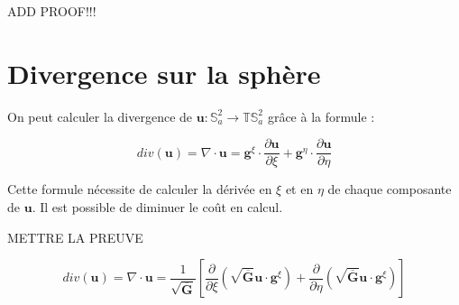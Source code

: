 ADD PROOF!!!


\section{Divergence sur la sphère}

On peut calculer la divergence de $\mathbf{u} : \mathbb{S}^2_a \rightarrow \mathbb{T} \mathbb{S}^2_a$ grâce à la formule :

\begin{equation}
div( \mathbf{u} ) = \nabla \cdot \mathbf{u} = \mathbf{g}^{\xi} \cdot \dfrac{\partial \mathbf{u}}{\partial \xi} + \mathbf{g}^{\eta} \cdot \dfrac{\partial \mathbf{u}}{\partial \eta}
\label{eq:divergence_old}
\end{equation}

Cette formule nécessite de calculer la dérivée en $\xi$ et en $\eta$ de chaque composante de $\mathbf{u}$. Il est possible de diminuer le coût en calcul.

METTRE LA PREUVE

\begin{equation}
div( \mathbf{u} ) = \nabla \cdot \mathbf{u} = \dfrac{1}{\sqrt{\overline{\mathbf{G}}}} \left[ \dfrac{\partial}{\partial \xi} \left( \sqrt{\overline{\mathbf{G}}} \mathbf{u} \cdot \mathbf{g}^{\xi} \right) + \dfrac{\partial}{\partial \eta} \left( \sqrt{\overline{\mathbf{G}}} \mathbf{u} \cdot \mathbf{g}^{\xi} \right) \right]
\label{eq:divergence}
\end{equation}

